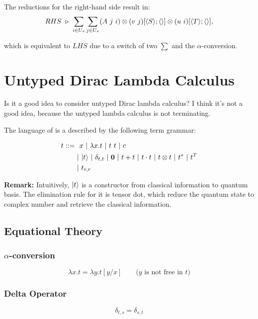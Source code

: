 The reductions for the right-hand side result in:
$$
RHS\ \triangleright\ \sum_{i \in U_\tau} \sum_{j \in U_\tau} (A\ j\ i) \otimes (v\ j)[\langle S\rangle; \langle\rangle] \otimes (u\ i)[\langle T\rangle; \langle\rangle],
$$

which is equivalent to $LHS$ due to a switch of two $\sum$ and the $\alpha$-conversion.








\section{Untyped Dirac Lambda Calculus}
Is it a good idea to consider untyped Dirac lambda calculus? I think it's not a good idea, because the untyped lambda calculus is not terminating.

\begin{definition}

    The language of is a described by the following term grammar:

    \begin{align*}
        t ::=\ & \ x\ |\ \lambda x.t\ |\ t\ t\ |\ c \\
              & |\ |t\rangle\ |\ \delta_{t, t} \ |\ \mathbf{0}\ |\ t + t\ |\ t \cdot t\ |\ t \otimes t\ |\ t^*\ |\ t^T\\
              & |\ t_{r, r}
    \end{align*}

\end{definition}

\textbf{Remark:} Intuitively, $|t\rangle$ is a constructor from classical information to quantum basis. The elimination rule for it is tensor dot, which reduce the quantum state to complex number and retrieve the classical information.


\subsection{Equational Theory}

\subsubsection*{$\alpha$-conversion}
$$
    \lambda x.t = \lambda y.t[y/x]\qquad \text{($y$ is not free in $t$)}
$$

\subsubsection*{Delta Operator}
$$
    \delta_{t, s} = \delta_{s, t}
$$

